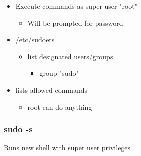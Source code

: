 \documentclass{report}
\begin{document}
    \bigbreak \noindent 
    \begin{itemize}
    \subsection{Sudo}
        \item Execute commands as super user "root"
            \begin{itemize}
                \item Will be prompted for password  
            \end{itemize}
        \item /etc/sudoers
            \begin{itemize}
                \item list designated users/groups
                    \begin{itemize}
                        \item group "sudo"
                    \end{itemize}
            \end{itemize}
        \item lists allowed commands
            \begin{itemize}
                \item root can do anything
            \end{itemize}
    \end{itemize}

    \bigbreak \noindent 
    \subsubsection{sudo -s}
    \bigbreak \noindent 
    Runs new shell with super user privileges

    \bigbreak \noindent 
\end{document}
